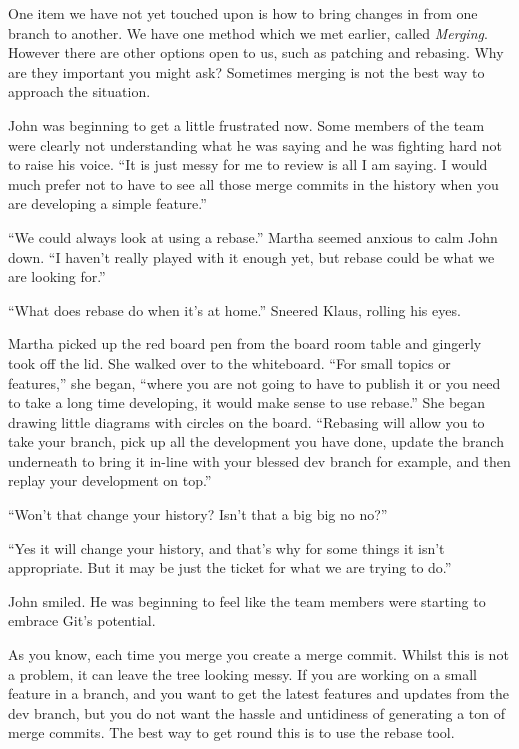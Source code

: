 One item we have not yet touched upon is how to bring changes in from one branch to another.
We have one method which we met earlier, called \emph{Merging}.
However there are other options open to us, such as patching and rebasing.
Why are they important you might ask? Sometimes merging is not the best way to approach the situation.

\begin{trenches}
John was beginning to get a little frustrated now.
Some members of the team were clearly not understanding what he was saying and he was fighting hard not to raise his voice.
``It is just messy for me to review is all I am saying. I would much prefer not to have to see all those merge commits in the history when you are developing a simple feature.''

``We could always look at using a rebase.'' Martha seemed anxious to calm John down.
``I haven't really played with it enough yet, but rebase could be what we are looking for.''

``What does rebase do when it's at home.'' Sneered Klaus, rolling his eyes.

Martha picked up the red board pen from the board room table and gingerly took off the lid.
She walked over to the whiteboard.
``For small topics or features,'' she began,
``where you are not going to have to publish it or you need to take a long time developing, it would make sense to use rebase.''
She began drawing little diagrams with circles on the board.
``Rebasing will allow you to take your branch, pick up all the development you have done, update the branch underneath to bring it in-line with your blessed dev branch for example, and then replay your development on top.''

``Won't that change your history? Isn't that a big big no no?''

``Yes it will change your history, and that's why for some things it isn't appropriate. But it may be just the ticket for what we are trying to do.''

John smiled.
He was beginning to feel like the team members were starting to embrace Git's potential.
\end{trenches}

As you know, each time you merge you create a merge commit.
Whilst this is not a problem, it can leave the tree looking messy.
If you are working on a small feature in a branch, and you want to get the latest features and updates from the dev branch, but you do not want the hassle and untidiness of generating a ton of merge commits.
The best way to get round this is to use the rebase tool.

